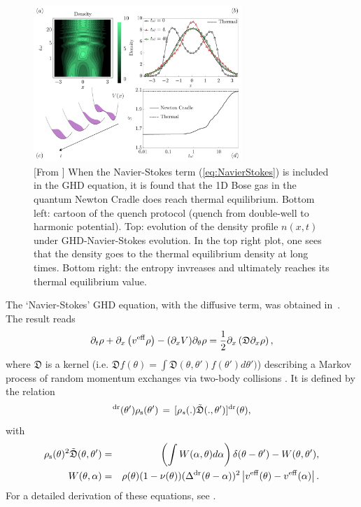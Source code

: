 \documentclass[onecolumn,amsfonts,showpacs,superscriptaddress]{revtex4-1}
\begin{document}
\begin{figure}[ht]
    \centering
    \includegraphics[width=0.7\textwidth]{figures/diffusion_trap.png}
    \caption{[From \citep{bastianello_thermalization_2020}] When the Navier-Stokes term (\ref{eq:NavierStokes}) is included in the GHD equation, it is found that the 1D Bose gas in the quantum Newton Cradle does reach thermal equilibrium. Bottom left: cartoon of the quench protocol (quench from double-well to harmonic potential). Top: evolution of the density profile $n(x,t)$ under GHD-Navier-Stokes evolution. In the top right plot, one sees that the density goes to the thermal equilibrium density at long times. Bottom right: the entropy invreases and ultimately reaches its thermal equilibrium value.}
    \label{fig:thermalization_diffusion}
\end{figure}


The `Navier-Stokes' GHD equation, with the diffusive term, was obtained in~\citep{de2018hydrodynamic}. The result reads
\begin{equation}
    \label{eq:NavierStokes}
    \partial_t \rho + \partial_x \left( v^{\rm eff} \rho \right) - (\partial_x V) \partial_\theta \rho  = \frac{1}{2} \partial_x \left( \mathfrak{D} \partial_x \rho \right) ,
\end{equation}
where $\mathfrak{D}$ is a kernel (i.e. $\mathfrak{D} f (\theta) = \int \mathfrak{D}(\theta,\theta') f (\theta') d\theta')$) describing a Markov process of random momentum exchanges via two-body collisions \citep{gopalakrishnan2018hydrodynamics,de2019diffusion}. It is defined by the relation
\begin{equation}
    [\mathfrak{D}(\theta,.) ]^{\rm dr} (\theta') \rho_{\rm s}(\theta') \, = \, [ \rho_s (.) \tilde{\mathfrak{D}} (., \theta') ]^{\rm dr} (\theta) ,
\end{equation}
with
\begin{eqnarray*}
    \rho_{\rm s} (\theta)^2 \tilde{\mathfrak{D}}(\theta, \theta') & = & \left(\int W(\alpha, \theta) d\alpha \right) \delta(\theta-\theta') - W(\theta, \theta') ,\\
    W(\theta,\alpha) &=& \rho(\theta) (1-\nu(\theta)) (\Delta^{\rm dr} (\theta - \alpha))^2 \left| v^{\rm eff}(\theta) - v^{\rm eff}(\alpha) \right| .
\end{eqnarray*}
For a detailed derivation of these equations, see \citep{de2019diffusion}.
\end{document}
